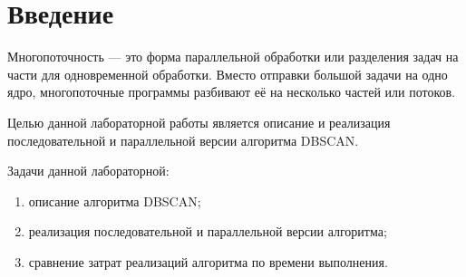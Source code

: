 \chapter*{Введение}

Многопоточность --- это форма параллельной обработки или разделения задач на части для одновременной обработки. Вместо отправки большой задачи на одно ядро, многопоточные программы разбивают её на несколько частей или потоков.

Целью данной лабораторной работы является описание и реализация последовательной и параллельной версии алгоритма DBSCAN.

Задачи данной лабораторной:
\begin{enumerate}
	\item описание алгоритма DBSCAN;
	\item реализация последовательной и параллельной версии алгоритма;
	\item сравнение затрат реализаций алгоритма по времени выполнения.
\end{enumerate}
